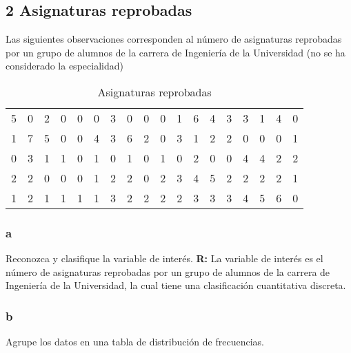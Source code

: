 \documentclass{templateNote}
\begin{document}
\newpage
\begin{samepage}
    
    \subsection{2 Asignaturas reprobadas}
    \indent
    Las siguientes observaciones corresponden al número de asignaturas reprobadas por un
    grupo de alumnos de la carrera de Ingeniería de la Universidad (no se ha considerado la
    especialidad)
    \begin{table}[H]
        \begin{center}
            \begin{tabular}{| c | c | c | c | c | c | c | c | c | c | c | c | c | c | c | c | c | c |}
                \hline
                5 & 0 & 2 & 0 & 0 & 0 & 3 & 0 & 0 & 0 & 1 & 6 & 4 & 3 & 3 & 1 & 4 & 0 \\
                1 & 7 & 5 & 0 & 0 & 4 & 3 & 6 & 2 & 0 & 3 & 1 & 2 & 2 & 0 & 0 & 0 & 1 \\
                0 & 3 & 1 & 1 & 0 & 1 & 0 & 1 & 0 & 1 & 0 & 2 & 0 & 0 & 4 & 4 & 2 & 2 \\
                2 & 2 & 0 & 0 & 0 & 1 & 2 & 2 & 0 & 2 & 3 & 4 & 5 & 2 & 2 & 2 & 2 & 1 \\
                1 & 2 & 1 & 1 & 1 & 1 & 3 & 2 & 2 & 2 & 2 & 3 & 3 & 3 & 4 & 5 & 6 & 0 \\
                \hline
            \end{tabular}
            \caption{Asignaturas reprobadas}
        \end{center}
    \end{table}
    \subsubsection{a}
    \indent
    Reconozca y clasifique la variable de interés.
    \textbf{R:} La variable de interés es el número de asignaturas reprobadas por un grupo de alumnos de la carrera de Ingeniería de la Universidad, la cual tiene una clasificación cuantitativa discreta.
    
    \subsubsection{b}
    \indent
    Agrupe los datos en una tabla de distribución de frecuencias.
    

\end{samepage}
\end{document}
